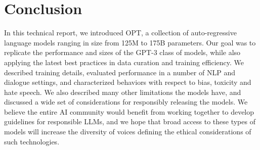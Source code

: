 \section{Conclusion}
\label{sec:conclusion}

In this technical report, we introduced OPT, a collection of auto-regressive language models ranging in size from 125M to 175B parameters. 
Our goal was to replicate the performance and sizes of the GPT-3 class of models, while also applying the latest best practices in data curation and training efficiency.
We described training details, evaluated performance in a number of NLP and dialogue settings, and characterized behaviors with respect to bias, toxicity and hate speech. We also described many other limitations the models have, and discussed a wide set of considerations for responsibly releasing the models. We believe the entire AI community would benefit from working together to develop guidelines for responsible LLMs, and we hope that broad access to these types of models will increase the diversity of voices defining the ethical considerations of such technologies.


